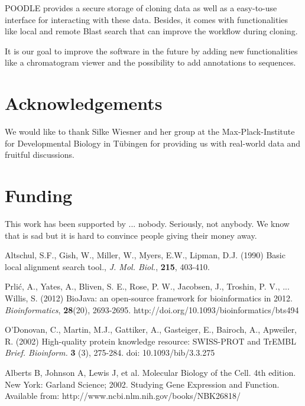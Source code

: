\documentclass{bioinfo}
\begin{document}
POODLE provides a secure storage of cloning data as well as a easy-to-use interface for 
interacting with these data. Besides, it comes with functionalities like local and remote Blast 
search that can improve the workflow during cloning. 

It is our goal to improve the software in the future by adding new functionalities like a chromatogram 
viewer and the possibility to add annotations to sequences. 

\section*{Acknowledgements}

We would like to thank Silke Wiesner and her group at the Max-Plack-Institute for Developmental Biology 
in T\"{u}bingen for providing us with real-world data and fruitful discussions.

\section*{Funding}

This work has been supported by ... nobody. Seriously, not anybody. We know that is sad but it is hard 
to convince people giving their money away.

%
%
%
%
%
%
%
%
%


\begin{thebibliography}{}

Altschul, S.F., Gish, W., Miller, W., Myers, E.W., Lipman, D.J. (1990) Basic local alignment search tool., {\it J. Mol. Biol.}, {\bf 215}, 403-410.

Prli\'{c}, A., Yates, A., Bliven, S. E., Rose, P. W., Jacobsen, J., Troshin, P. V., ... Willis, S. (2012) BioJava: an open-source framework for bioinformatics in 2012. {\it Bioinformatics}, {\bf 28}(20), 2693-2695. http://doi.org/10.1093/bioinformatics/bts494

O'Donovan, C., Martin, M.J., Gattiker, A., Gasteiger, E., Bairoch, A., Apweiler, R. (2002) High-quality protein knowledge resource: SWISS-PROT and TrEMBL {\it Brief. Bioinform.}  {\bf 3} (3), 275-284. doi: 10.1093/bib/3.3.275 

Alberts B, Johnson A, Lewis J, et al. Molecular Biology of the Cell. 4th edition. New York: Garland Science; 2002. Studying Gene Expression and Function. Available from: http://www.ncbi.nlm.nih.gov/books/NBK26818/

\end{thebibliography}
\end{document}
